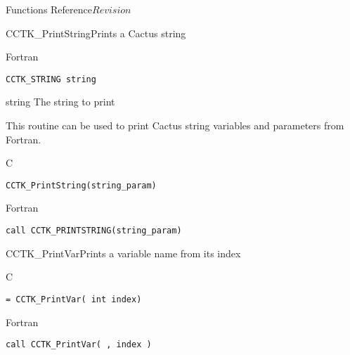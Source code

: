 \begin{cactuspart}{ Functions Reference}{}{$Revision$}
\begin{FunctionDescription}{CCTK\_PrintString}{Prints a Cactus string}
\begin{SynopsisSection}
\begin{Synopsis}{Fortran}
\begin{verbatim}
CCTK_STRING string\end{verbatim}
\end{Synopsis}
\end{SynopsisSection}
\begin{ParameterSection}
\begin{Parameter}{string}
The string to print
\end{Parameter}
\end{ParameterSection}
\begin{Discussion}
This routine can be used to print Cactus string variables and parameters
from Fortran.
\end{Discussion}
\begin{ExampleSection}
\begin{Example}{C}
\begin{verbatim}
CCTK_PrintString(string_param)
\end{verbatim}
\end{Example}
\begin{Example}{Fortran}
\begin{verbatim}
call CCTK_PRINTSTRING(string_param)
\end{verbatim}
\end{Example}
\end{ExampleSection}
\end{FunctionDescription}




\begin{FunctionDescription}{CCTK\_PrintVar}{Prints a variable name from its index}
\label{CCTK-PrintVar}
\begin{SynopsisSection}
\begin{Synopsis}{C}
\begin{verbatim}= CCTK_PrintVar( int index)\end{verbatim}
\end{Synopsis}
\begin{Synopsis}{Fortran}
\begin{verbatim}call CCTK_PrintVar( , index )


\end{verbatim}
\end{Synopsis}
\end{SynopsisSection}
\end{FunctionDescription}
\end{cactuspart}
